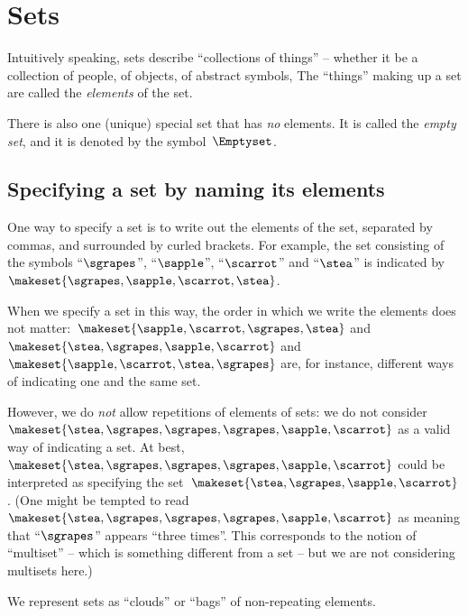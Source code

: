 
\section{Sets}

Intuitively speaking, sets describe ``collections of things'' -- whether it be a collection of people, of objects, of abstract symbols, \etc
The ``things'' making up a set are called the \emph{elements} of the set.

There is also one (unique) special set that has \emph{no} elements.
It is called the \emph{empty set}, and it is denoted by the symbol~$\Emptyset$.

\subsection{Specifying a set by naming its elements}

One way to specify a set is to write out the elements of the set, separated by commas, and surrounded by curled brackets.
For example, the set consisting of the symbols ``$\sgrapes$'', ``$\sapple$'', ``$\scarrot$'' and ``$\stea$'' is indicated by~$\makeset{ \sgrapes, \sapple, \scarrot, \stea}$.

When we specify a set in this way, the order in which we write the elements does not matter:~$\makeset{ \sapple, \scarrot, \sgrapes, \stea}$ and~$\makeset{ \stea, \sgrapes, \sapple, \scarrot}$ and~$\makeset{ \sapple, \scarrot, \stea, \sgrapes}$ are, for instance, different ways of indicating one and the same set.

However, we do \emph{not} allow repetitions of elements of sets: we do not consider~$\makeset{ \stea, \sgrapes, \sgrapes, \sgrapes, \sapple, \scarrot }$ as a valid way of indicating a set.
At best,~$\makeset{ \stea, \sgrapes, \sgrapes, \sgrapes, \sapple, \scarrot }$ could be interpreted as specifying the set~$\makeset{ \stea, \sgrapes, \sapple, \scarrot }$.
(One might be tempted to read $\makeset{ \stea, \sgrapes, \sgrapes, \sgrapes, \sapple, \scarrot }$ as meaning that ``$\sgrapes$'' appears ``three times''.
This corresponds to the notion of ``multiset'' -- which is something different from a set -- but we are not considering multisets here.)

\begin{marginfigure}
    \centering
    \caption{We represent sets as ``clouds'' or ``bags'' of non-repeating elements.}
    \label{fig:set_as_clouds}
\end{marginfigure}

